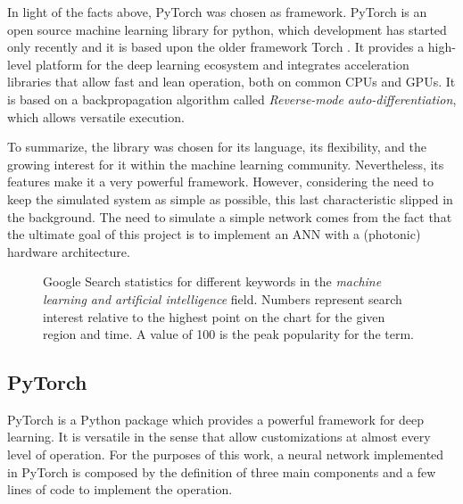 In light of the facts above, PyTorch was chosen as framework.
PyTorch is an open source machine learning library for python, which development has started only recently and it is based upon the older framework Torch  \cite{PyTorch.org}.
It provides a high-level platform for the deep learning ecosystem and integrates acceleration libraries that allow fast and lean operation, both on common CPUs and GPUs.
It is based on a backpropagation algorithm called \textit{Reverse-mode auto-differentiation}, which allows versatile execution.

To summarize, the library was chosen for its language, its flexibility, and the growing interest for it within the machine learning community.
Nevertheless, its features make it a very powerful framework. However, considering the need to keep the simulated system as simple as possible, this last characteristic slipped in the background.
The need to simulate a simple network comes from the fact that the ultimate goal of this project is to implement an ANN with a (photonic) hardware architecture.

\begin{figure}[htbp]
	\centering
	
	\caption{Google Search statistics for different keywords in the \textit{machine learning and artificial intelligence} field.
		Numbers represent search interest relative to the highest point on the chart for the given region and time.
		A value of 100 is the peak popularity for the term.}
	\label{fig:GoogleTrendsPyTorch}
\end{figure}


\subsection{PyTorch}
\label{ssec:PyTorch}
PyTorch is a Python package which provides a powerful framework for deep learning.
It is versatile in the sense that allow customizations at almost every level of operation.
For the purposes of this work, a neural network implemented in PyTorch is composed by the definition of three main components and a few lines of code to implement the operation.

